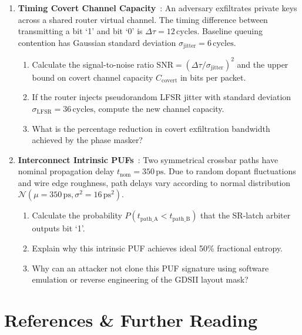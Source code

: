 \begin{enumerate}
    \item \textbf{Timing Covert Channel Capacity}~\cite{Jaster2025Trust}: An adversary exfiltrates private keys across a shared router virtual channel. The timing difference between transmitting a bit `1' and bit `0' is $\Delta \tau = 12\,\mathrm{cycles}$. Baseline queuing contention has Gaussian standard deviation $\sigma_{\mathrm{jitter}} = 6\,\mathrm{cycles}$.
    \begin{enumerate}
        \item Calculate the signal-to-noise ratio $\mathrm{SNR} = (\Delta \tau / \sigma_{\mathrm{jitter}})^2$ and the upper bound on covert channel capacity $C_{\mathrm{covert}}$ in bits per packet.
        \item If the router injects pseudorandom LFSR jitter with standard deviation $\sigma_{\mathrm{LFSR}} = 36\,\mathrm{cycles}$, compute the new channel capacity.
        \item What is the percentage reduction in covert exfiltration bandwidth achieved by the phase masker?
    \end{enumerate}

    \item \textbf{Interconnect Intrinsic PUFs}~\cite{Grover2025PUF}: Two symmetrical crossbar paths have nominal propagation delay $t_{\mathrm{nom}} = 350\,\mathrm{ps}$. Due to random dopant fluctuations and wire edge roughness, path delays vary according to normal distribution $\mathcal{N}(\mu = 350\,\mathrm{ps}, \sigma^2 = 16\,\mathrm{ps}^2)$.
    \begin{enumerate}
        \item Calculate the probability $P(t_{\mathrm{path\_A}} < t_{\mathrm{path\_B}})$ that the SR-latch arbiter outputs bit `1'.
        \item Explain why this intrinsic PUF achieves ideal 50\% fractional entropy.
        \item Why can an attacker not clone this PUF signature using software emulation or reverse engineering of the GDSII layout mask?
    \end{enumerate}
\end{enumerate}

\section{References \& Further Reading}
\label{sec:ch11_references}

